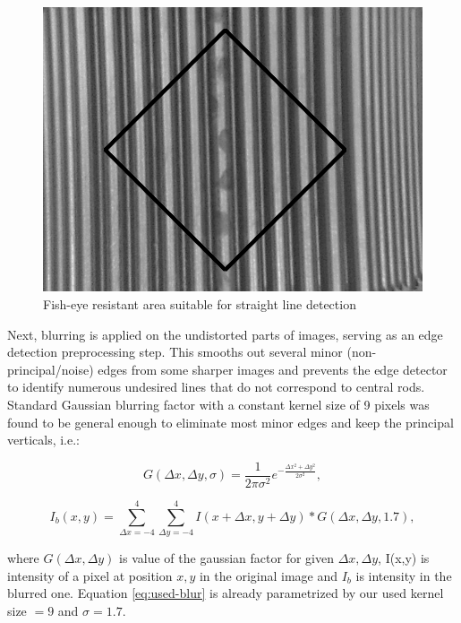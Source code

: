 \documentclass[preprint,12pt]{elsarticle}
\begin{document}
\begin{figure}
    \centering
    \includegraphics{central_part.png}
    \caption{Fish-eye resistant area suitable for straight line detection}
    \label{fig:fisheye_resistant_area}
\end{figure}

Next, blurring is applied on the undistorted parts of images, serving as an edge detection preprocessing step. This smooths out several minor (non-principal/noise) edges from some sharper images and prevents the edge detector to identify numerous undesired lines that do not correspond to central rods. Standard Gaussian blurring factor with a constant kernel size of 9 pixels was found to be general enough to eliminate most minor edges and keep the principal verticals, i.e.:

\begin{equation}
G(\Delta x,\Delta y,\sigma)=\frac{1}{2\pi\sigma^2}e^{-\frac{\Delta x^2+\Delta y^2}{2\sigma^2}},
\end{equation}

\begin{equation}
    I_b(x,y)=\sum_{\Delta x=-4}^4\sum_{\Delta y=-4}^{4} I(x+\Delta x, y+\Delta y) * G(\Delta x,\Delta y, 1.7),
    \label{eq:used-blur}
\end{equation}

where $G(\Delta x,\Delta y)$ is value of the gaussian factor for given $\Delta x,\Delta y$, I(x,y) is intensity of a pixel at position $x,y$ in the original image and $I_b$ is intensity in the blurred one. Equation \ref{eq:used-blur} is already parametrized by our used kernel size $=9$ and $\sigma=1.7$.
\end{document}
